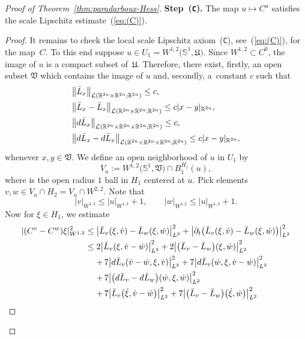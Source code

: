 \documentclass[10pt,a4paper]{amsart}
\def\abs#1{\mathopen|#1\mathclose|}
\newcommand{\Ll}{{\mathcal{L}}} %
\newcommand{\R}{{\mathbb{R}}}
\newcommand{\p}{{\partial}}
\renewcommand{\SS}{{\mathbb{S}}}
\begin{document}
\begin{proof}[Proof of Theorem~\ref{thm:paradarboux-Hess}]
\noindent
\textbf{Step~(\texttt{C}).} The map $u\mapsto C^u$ satisfies the scale
Lipschitz estimate~(\ref{eq:(C)}).


\begin{proof}
It remains to check the local scale Lipschitz axiom~(\texttt{C}),
see~(\ref{eq:(C)}), for the map~$C$.
To this end suppose $u\in U_1=W^{1,2}\bigl(\SS^1,\mathfrak{U}\bigr)$.
Since $W^{1,2}\subset C^0$, the image of $u$ is a compact subset
of~$\mathfrak{U}$. Therefore, there exist, firstly, an open subset
$\mathfrak{V}$ which contains the image of $u$ and, secondly, a~constant $c$ such that
\begin{align}
 &\bigl\|\bar L_x\bigr\|_{\Ll(\R^{2n}\times\R^{2n};\R^{2n})}
\le c, \nonumber
\\
 &\bigl\|\bar L_x-\bar L_x\bigr\|_{\Ll(\R^{2n}\times\R^{2n};\R^{2n})}
\le c \abs{x-y}_{\R^{2n}}, \nonumber
\\
 &\bigl\| {\rm d}\bar L_x\bigr\|_{\Ll(\R^{2n}\times\R^{2n}\times\R^{2n};\R^{2n})}
\le c ,\nonumber
\\
 &\bigl\|{\rm d}\bar L_x-{\rm d}\bar L_x\bigr\|_{\Ll(\R^{2n}\times\R^{2n}\times\R^{2n};\R^{2n})}
\le c \abs{x-y}_{\R^{2n}},\label{eq:L-est}
\end{align}
whenever $x,y\in\mathfrak{V}$.
We define an open neighborhood of $u$ in $U_1$ by
\[
 V_u:=W^{1,2}\bigl(\SS^1,\mathfrak{V}\bigr)
 \cap B_1^{H_1}(u),
\]
where  is the open radius $1$ ball in $H_1$ centered at $u$.
Pick elements $v,w\in V_u\cap H_2 =V_u\cap W^{2,2}$.
Note that
\[
 \abs{v}_{W^{1,2}}\le \abs{u}_{W^{1,2}}+1
 ,\qquad
 \abs{w}_{W^{1,2}}\le \abs{u}_{W^{1,2}}+1 .
\]
Now for $\xi\in H_1$, we estimate
\begin{equation*}
\begin{split}
 \abs{(C^v-C^w)\xi}_{W^{1,2}}^2
 \le{}& \bigl|\bar L_v(\xi,\dot v)-\bar L_w(\xi,\dot w)\bigr|_{L^2}^2
 +\bigl|\p_t\bigl(\bar L_v(\xi,\dot v)-\bar L_w(\xi,\dot w)\bigr)\bigr|_{L^2}^2
\\
 \le{}& 2\bigl|\bar L_v(\xi,\dot v-\dot w)\bigr|_{L^2}^2
 +2\bigl|\bigl(\bar L_v-\bar L_w\bigr) (\xi,\dot w)\bigr|_{L^2}^2
 \\
 &{+}\,7\bigl|{\rm d}\bar L_v(\dot v-\dot w,\xi,\dot v)\bigr|_{L^2}^2
 +7\bigl|{\rm d}\bar L_v(\dot w,\xi,\dot v-\dot w)\bigr|_{L^2}^2
 \\
 &{+}\,7\bigl|\bigl({\rm d}\bar L_v-{\rm d}\bar L_w\bigr)(\dot w,\xi,\dot w)\bigr|_{L^2}^2
 \\
 &{+}\,7\bigl|\bar L_v\bigl(\dot \xi,\dot v-\dot w\bigr)\bigr|_{L^2}^2
 +7\bigl|\bigl(\bar L_v-\bar L_w\bigr)\bigl(\dot \xi,\dot w\bigr)\bigr|_{L^2}^2

\end{split}
\end{equation*}
\end{proof}
\end{proof}
\end{document}
